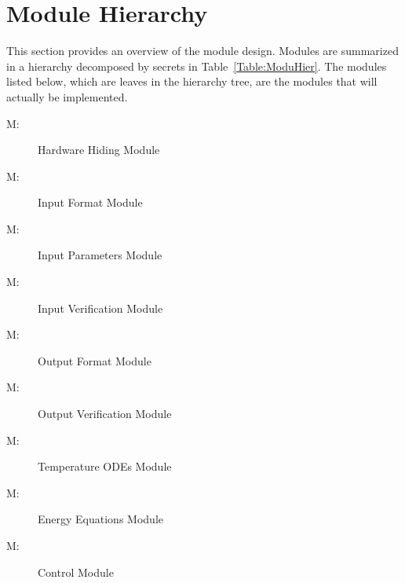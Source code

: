 \documentclass[12pt]{article}
\newcounter{modnum}
\newcommand{\mthemodnum}{M\themodnum}
\begin{document}
\section{Module Hierarchy}
\label{Sec:ModuHier}
This section provides an overview of the module design. Modules are summarized in a hierarchy decomposed by secrets in Table~\ref{Table:ModuHier}. The modules listed below, which are leaves in the hierarchy tree, are the modules that will actually be implemented.
\begin{description}
\item[\mthemodnum\label{MhwHiding}:]Hardware Hiding Module
\end{description}
\begin{description}
\item[\mthemodnum\label{MmodInputFormat}:]Input Format Module
\end{description}
\begin{description}
\item[\mthemodnum\label{MmodInputParams}:]Input Parameters Module
\end{description}
\begin{description}
\item[\mthemodnum\label{MmodInputVerif}:]Input Verification Module
\end{description}
\begin{description}
\item[\mthemodnum\label{Mmodoutputfdesc}:]Output Format Module
\end{description}
\begin{description}
\item[\mthemodnum\label{Mmodoutputvdesc}:]Output Verification Module
\end{description}
\begin{description}
\item[\mthemodnum\label{Mmodtempdesc}:]Temperature ODEs Module
\end{description}
\begin{description}
\item[\mthemodnum\label{Mmodenerdesc}:]Energy Equations Module
\end{description}
\begin{description}
\item[\mthemodnum\label{MmodControl}:]Control Module
\end{description}
\end{document}
